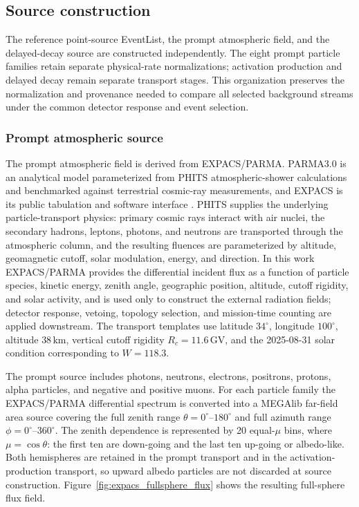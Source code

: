 \documentclass[11pt]{article}
\begin{document}
\subsection{Source construction}
\label{sec:background}

The reference point-source EventList, the prompt atmospheric field, and the
delayed-decay source are constructed independently. The eight prompt
particle families retain separate physical-rate normalizations; activation production and delayed
decay remain separate transport stages. This organization preserves the
normalization and provenance needed to compare all selected background streams
under the common detector response and event selection.

\subsubsection{Prompt atmospheric source}
\label{subsec:prompt_source}

The prompt atmospheric field is derived from EXPACS/PARMA. PARMA3.0 is an
analytical model parameterized from PHITS atmospheric-shower calculations and
benchmarked against terrestrial cosmic-ray measurements, and EXPACS is its
public tabulation and software interface
\cite{Sato2015EXPACS,Sato2016PARMA4}. PHITS supplies the underlying
particle-transport physics: primary cosmic rays interact with air nuclei, the
secondary hadrons, leptons, photons, and neutrons are transported through the
atmospheric column, and the resulting fluences are parameterized by altitude,
geomagnetic cutoff, solar modulation, energy, and direction. In this work
EXPACS/PARMA provides the differential incident flux as a function of particle
species, kinetic energy, zenith angle, geographic position, altitude, cutoff
rigidity, and solar activity, and is used only to construct the external
radiation fields; detector response, vetoing, topology selection, and
mission-time counting are applied downstream. The transport templates
use latitude $34^\circ$, longitude $100^\circ$, altitude $38\,\mathrm{km}$,
vertical cutoff rigidity $R_c=11.6\,\mathrm{GV}$, and the 2025-08-31 solar
condition corresponding to $W=118.3$.

The prompt source includes photons, neutrons, electrons, positrons, protons,
alpha particles, and negative and positive muons. For each particle family the
EXPACS/PARMA differential spectrum is converted into a MEGAlib far-field area
source covering the full zenith range $\theta=0^\circ$--$180^\circ$ and full
azimuth range $\phi=0^\circ$--$360^\circ$. The zenith dependence is represented
by 20 equal-$\mu$ bins, where $\mu=\cos\theta$: the first ten are down-going and
the last ten up-going or albedo-like. Both
hemispheres are retained in the prompt transport and in the
activation-production transport, so upward albedo particles are not discarded
at source construction. Figure~\ref{fig:expacs_fullsphere_flux} shows the
resulting full-sphere flux field.
\end{document}
